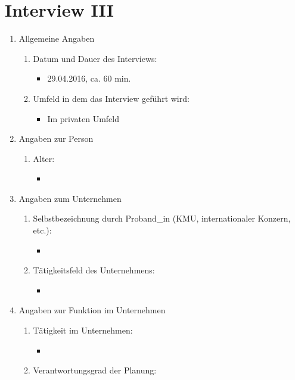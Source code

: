 \documentclass[Bachelorarbeit.tex]{subfiles}
\begin{document}
\section{Interview III}
\begin{enumerate}
	\item Allgemeine Angaben
	\begin{enumerate}
		\item Datum und Dauer des Interviews:
		\begin{itemize}
			\item[] 29.04.2016, ca. 60 min.
		\end{itemize}
		\item Umfeld in dem das Interview geführt wird:
		\begin{itemize}
			\item[] Im privaten Umfeld
		\end{itemize}
	\end{enumerate}
	\item Angaben zur Person
	\begin{enumerate}
		\item Alter:
		\begin{itemize}
			\item[] 
		\end{itemize}
	\end{enumerate}
	\item Angaben zum Unternehmen
	\begin{enumerate}
		\item Selbstbezeichnung durch Proband\_in  (\ac{KMU}, internationaler Konzern, etc.):
		\begin{itemize}
			\item[] 
		\end{itemize}
		\item Tätigkeitsfeld des Unternehmens:
		\begin{itemize}
			\item[] 
		\end{itemize}
	\end{enumerate}
	\item Angaben zur Funktion im Unternehmen
	\begin{enumerate}
		\item Tätigkeit im Unternehmen:
		\begin{itemize}
			\item[] 
		\end{itemize}
		\item Verantwortungsgrad der Planung:
		\begin{enumerate}

\end{enumerate}
\end{enumerate}
\end{enumerate}
\end{document}
